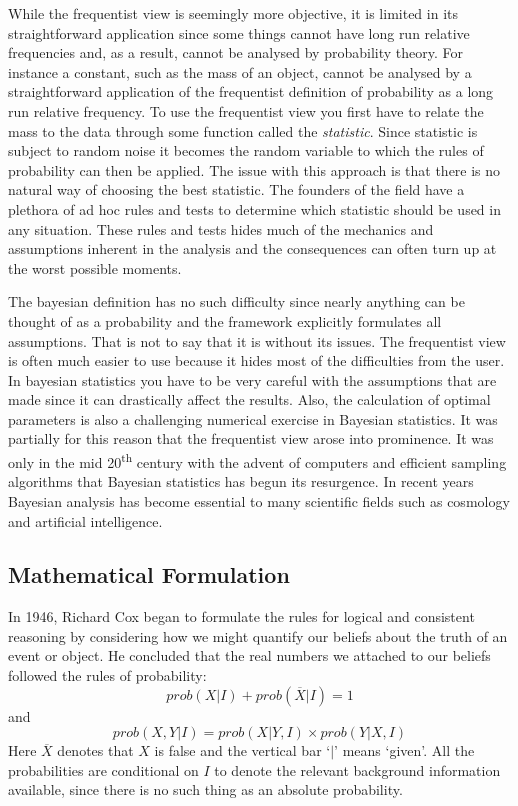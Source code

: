 \documentclass[12pt]{article}
\numberwithin{equation}{section}
\begin{document}
While the frequentist view is seemingly more objective, it is limited 
in its straightforward application since some things cannot have long 
run relative frequencies and, as a result, cannot be analysed by 
probability theory. For instance a constant, such as the mass of an 
object, cannot be analysed by a straightforward application of the 
frequentist definition of probability as a long run relative frequency. 
To use the frequentist view you first have to relate the mass to the 
data through some function called the \emph{statistic}. Since 
statistic is subject to random noise it becomes the random variable to 
which the rules of probability can then be applied. The issue with this 
approach is that there is no natural way of choosing the best 
statistic.\cite{sivia2006data} The founders of the field have a 	
plethora of ad hoc rules and tests to determine which statistic should 
be used in any situation. These rules and tests hides much of the 	
mechanics and assumptions inherent in the analysis and the consequences 
can often turn up at the worst possible moments.

The bayesian definition has no such difficulty since nearly anything 
can be thought of as a probability and the framework explicitly 
formulates all assumptions. That is not to say that it is without its 
issues. The frequentist view is often much easier to use because it 
hides most of the difficulties from the user. In bayesian statistics 
you have to be very careful with the assumptions that are made since it 
can drastically affect the results. Also, the calculation of optimal 
parameters is also a challenging numerical exercise in Bayesian 
statistics. It was partially for this reason that the frequentist view 
arose into prominence. It was only in the mid 20\textsuperscript{th} 
century with the advent of computers and efficient sampling algorithms 
that Bayesian statistics has begun its resurgence. In recent years 
Bayesian analysis has become essential to many scientific fields such 
as cosmology and artificial intelligence.\cite{von2011bayesian}
\subsection{Mathematical Formulation}
In 1946, Richard Cox began to formulate the rules for logical and consistent
reasoning by considering how we might quantify our beliefs about the truth of 
an event or object. He concluded that the real numbers we attached to our
beliefs followed the rules of probability:\cite{sivia2006data} 
\begin{equation} \label{eq:sumrule}
	prob(X|I) + prob(\overline{X}|I) = 1
\end{equation}
and 
\begin{equation} \label{eq:productrule}
	prob(X,Y|I) = prob(X|Y,I) \times prob(Y|X,I)
\end{equation}
Here $\overline{X}$ denotes that $X$ is false and the vertical bar `$|$' means `given'. 
All the probabilities are conditional on $I$ to denote the relevant background information 
available, since there is no such thing as an absolute probability. 
\end{document}
